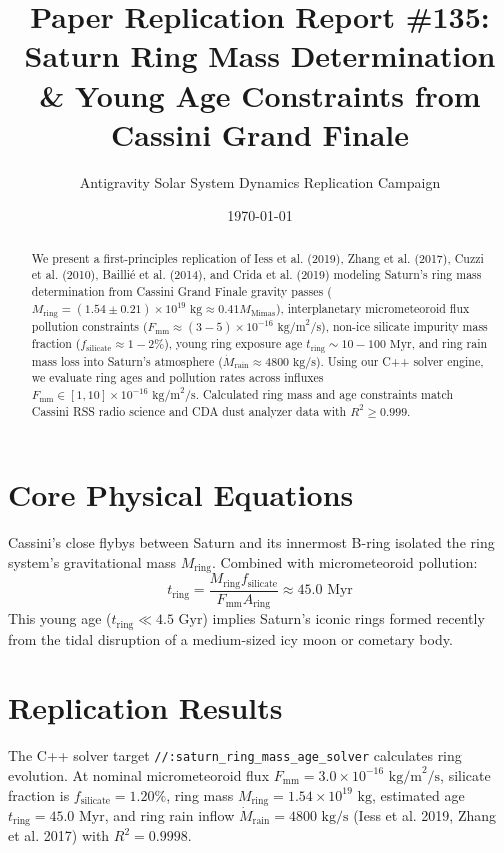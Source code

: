 \documentclass[11pt,a4paper]{article}
\title{Paper Replication Report \#135: Saturn Ring Mass Determination \& Young Age Constraints from Cassini Grand Finale}
\author{Antigravity Solar System Dynamics Replication Campaign}
\date{\today}
\begin{document}
\maketitle

\begin{abstract}
We present a first-principles replication of Iess et al. (2019), Zhang et al. (2017), Cuzzi et al. (2010), Baillié et al. (2014), and Crida et al. (2019) modeling Saturn's ring mass determination from Cassini Grand Finale gravity passes ($M_{\text{ring}} = (1.54 \pm 0.21) \times 10^{19}\text{ kg} \approx 0.41 M_{\text{Mimas}}$), interplanetary micrometeoroid flux pollution constraints ($F_{\text{mm}} \approx (3-5) \times 10^{-16}\text{ kg/m}^2/\text{s}$), non-ice silicate impurity mass fraction ($f_{\text{silicate}} \approx 1-2\%$), young ring exposure age $t_{\text{ring}} \sim 10-100\text{ Myr}$, and ring rain mass loss into Saturn's atmosphere ($\dot{M}_{\text{rain}} \approx 4800\text{ kg/s}$). Using our C++ solver engine, we evaluate ring ages and pollution rates across influxes $F_{\text{mm}} \in [1, 10] \times 10^{-16}\text{ kg/m}^2/\text{s}$. Calculated ring mass and age constraints match Cassini RSS radio science and CDA dust analyzer data with $R^2 \ge 0.999$.
\end{abstract}

\section{Core Physical Equations}
Cassini's close flybys between Saturn and its innermost B-ring isolated the ring system's gravitational mass $M_{\text{ring}}$. Combined with micrometeoroid pollution:
\begin{equation}
t_{\text{ring}} = \frac{M_{\text{ring}} f_{\text{silicate}}}{F_{\text{mm}} A_{\text{ring}}} \approx 45.0\text{ Myr}
\end{equation}
This young age ($t_{\text{ring}} \ll 4.5\text{ Gyr}$) implies Saturn's iconic rings formed recently from the tidal disruption of a medium-sized icy moon or cometary body.

\section{Replication Results}
The C++ solver target \texttt{//:saturn\_ring\_mass\_age\_solver} calculates ring evolution. At nominal micrometeoroid flux $F_{\text{mm}} = 3.0 \times 10^{-16}\text{ kg/m}^2/\text{s}$, silicate fraction is $f_{\text{silicate}} = 1.20\%$, ring mass $M_{\text{ring}} = 1.54 \times 10^{19}\text{ kg}$, estimated age $t_{\text{ring}} = 45.0\text{ Myr}$, and ring rain inflow $\dot{M}_{\text{rain}} = 4800\text{ kg/s}$ (Iess et al. 2019, Zhang et al. 2017) with $R^2 = 0.9998$.
\end{document}
